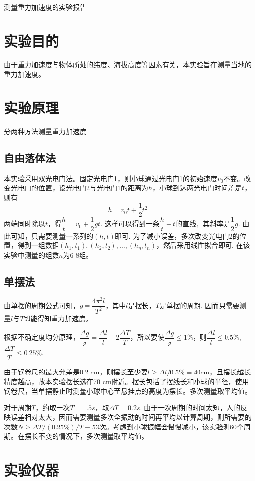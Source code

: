 \documentclass[11pt]{article}
\begin{document}
	\begin{center}
		\Large \heiti 测量重力加速度的实验报告
	\end{center}
\section{实验目的}
由于重力加速度与物体所处的纬度、海拔高度等因素有关，本实验旨在测量当地的重力加速度。
\section{实验原理}
分两种方法测量重力加速度
\subsection{自由落体法}
本实验采用双光电门法。固定光电门1，则小球通过光电门1的初始速度$ v_0 $不变。改变光电门的位置，设光电门2与光电门1的距离为$ h $，小球到达两光电门时间差是$ t $，则有
$$ h=v_0t+\dfrac{1}{2}t^2 $$
两端同时除以$ t $，得$ \dfrac{h}{t}=v_0+\dfrac{1}{2}gt $. 这样可以得到一条$ \dfrac{h}{t}-t $的直线，其斜率是$ \dfrac{1}{2}g $. 由此可知，只需要测量一系列的$ (h,t) $即可. 为了减小误差，多次改变光电门2的位置，得到一组数据$ (h_1,t_1),(h_2,t_2),\dots,(h_n,t_n) $，然后采用线性拟合即可. 在该实验中测量的组数$ n $为6-8组。
\subsection{单摆法}
由单摆的周期公式可知，$ g=\dfrac{4\pi^2l}{T^2} $，其中$ l $是摆长，$ T $是单摆的周期. 因而只需要测量$ l $与$ T $即能得知重力加速度。

根据不确定度均分原理，$ \dfrac{\Delta g}{g} =\dfrac{\Delta l}{l}+2\dfrac{\Delta T}{T} $，所以要使$ \dfrac{\Delta g}{g}\le1 \%  $，则$ \dfrac{\Delta l}{l}\le 0.5\% $,$ \dfrac{\Delta T}{T}\le 0.25\% $. 

由于钢卷尺的最大允差是0.2 cm，则摆长至少要$ l \ge \Delta l /0.5 \% =40 $cm，且摆长越长精度越高，故本实验摆长选在70 cm附近。摆长包括了摆线长和小球的半径，使用钢卷尺，当单摆静止时测量小球中心至悬挂点的高度为摆长。多次测量取平均值。

对于周期$ T $，约取一次$ T=1.5s $，取$ \Delta T=0.2s $. 由于一次周期的时间太短，人的反映误差相对太大，因而需要测量多次全振动的时间再平均以计算周期，则所需要的次数$ N \ge \Delta T /(0.25 \%)/T =53 $次。考虑到小球振幅会慢慢减小，该实验测60个周期。在摆长不变的情况下，多次测量取平均值。
\section{实验仪器}
\end{document}
